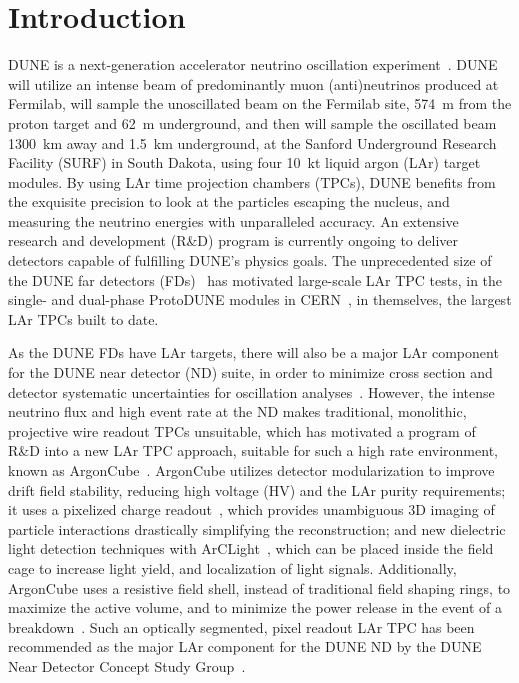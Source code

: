 \section{Introduction}
\label{sec:introduction}

DUNE is a next-generation accelerator neutrino oscillation experiment~\cite{DUNE, DUNE2}. DUNE will utilize an intense beam of predominantly muon (anti)neutrinos produced at Fermilab, will sample the unoscillated beam on the Fermilab site, \SI{574}{\metre} from the proton target and \SI{62}{\metre} underground, and then will sample the oscillated beam \SI{1300}{\kilo\metre} away and \SI{1.5}{\kilo\metre} underground, at the Sanford Underground Research Facility (SURF) in South Dakota, using four \SI{10}{\kilo\tonne} liquid argon (LAr) target modules. By using LAr time projection chambers (TPCs), DUNE benefits from the exquisite precision to look at the particles escaping the nucleus, and measuring the neutrino energies with unparalleled accuracy. An extensive research and development (R\&D) program is currently ongoing to deliver detectors capable of fulfilling DUNE's physics goals. The unprecedented size of the DUNE far detectors (FDs)~\cite{DUNE_IDR_v1, DUNE_IDR_v2, DUNE_IDR_v3} has motivated large-scale LAr TPC tests, in the single- and dual-phase ProtoDUNE modules in CERN~\cite{Abi:2017aow, Agostino:2014qoa}, in themselves, the largest LAr TPCs built to date.

As the DUNE FDs have LAr targets, there will also be a major LAr component for the DUNE near detector (ND) suite, in order to minimize cross section and detector systematic uncertainties for oscillation analyses~\cite{DUNE, DUNE2}. However, the intense neutrino flux and high event rate at the ND makes traditional, monolithic, projective wire readout TPCs unsuitable, which has motivated a program of R\&D into a new LAr TPC approach, suitable for such a high rate environment, known as ArgonCube~\cite{argoncube_loi}. ArgonCube utilizes detector modularization to improve drift field stability, reducing high voltage (HV) and the LAr purity requirements; it uses a pixelized charge readout~\cite{pixels, larpix}, which provides unambiguous 3D imaging of particle interactions drastically simplifying the reconstruction; and new dielectric light detection techniques with ArCLight~\cite{arclight}, which can be placed inside the field cage to increase light yield, and localization of light signals. Additionally, ArgonCube uses a resistive field shell, instead of traditional field shaping rings, to maximize the active volume, and to minimize the power release in the event of a breakdown~\cite{argoncube_fd}. Such an optically segmented, pixel readout LAr TPC has been recommended as the major LAr component for the DUNE ND by the DUNE Near Detector Concept Study Group~\cite{dune_ndcsg}.

